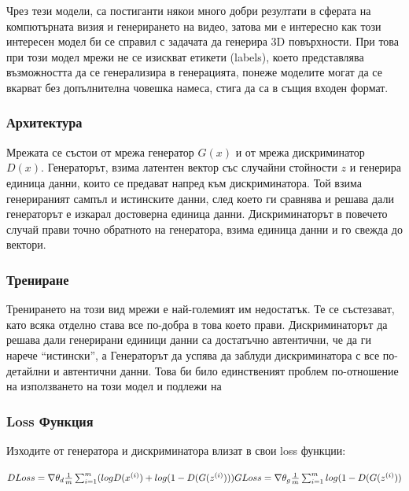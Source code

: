 Чрез тези модели, са постиганти някои много добри резултати в сферата на компютърната визия и генерирането на видео, затова ми е интересно как този интересен модел би се справил с задачата да генерира 3D повърхности. При това при този модел мрежи не се изискват етикети (labels), което представлява възможността да се генерализира в генерацията, понеже моделите могат да се вкарват без допълнителна човешка намеса, стига да са в същия входен формат.


\subsubsection{Архитектура}
Мрежата се състои от мрежа генератор $G(x)$ и от мрежа дискриминатор $D(x)$.
Генераторът, взима латентен вектор със случайни стойности $z$ и генерира единица данни, които се предават напред към дискриминатора. Той взима генерираният сампъл и истинските данни, след което ги сравнява и решава дали генераторът е изкарал достоверна единица данни. Дискриминаторът в повечето случай прави точно обратното на генератора, взима единица данни и го свежда до вектори.

\subsubsection{Трениране}
Тренирането на този вид мрежи е най-големият им недостатък. Те се състезават, като всяка отделно става все по-добра в това което прави. Дискриминаторът да решава дали генерирани единици данни са достатъчно автентични, че да ги нарече ``истински'', а Генераторът да успява да заблуди дискриминатора с все по-детайлни и автентични данни. Това би било единственият проблем по-отношение на използването на този модел и подлежи на 

\subsubsection{Loss Функция}
Изходите от генератора и дискриминатора влизат в свои loss функции:
\begin{center}
$
DLoss = \nabla \theta_d \frac{1}{m} \sum_{i=1}^m (logD(x^{(i)}) + log(1-D(G(z^{(i)})))\\
GLoss = \nabla \theta_g \frac{1}{m} \sum_{i=1}^m log(1-D(G(z^{(i)}))
$
\end{center}

